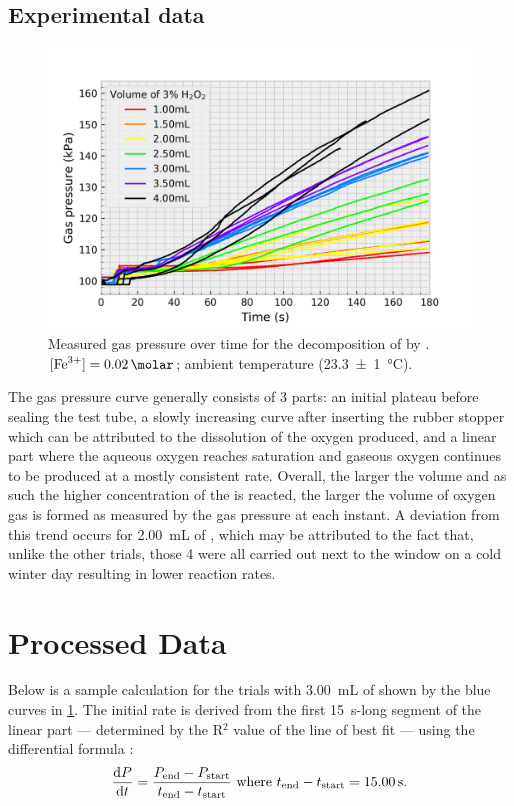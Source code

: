 \documentclass[a4paper, 12pt]{article}
\begin{document}
\subsection*{Experimental data}
\begin{figure}[H]
    \centering
    \includegraphics[width=\textwidth]{data/raw_data}
    \caption{Measured gas pressure over time for the decomposition of  by . $[\ce{Fe^{3+}}] = \SI{0.02}{\molar}$; ambient temperature (\SI{23.3(10)}{\celsius}). }
    \label{fig:raw-data}
\end{figure}

The gas pressure curve generally consists of 3 parts: an initial plateau before sealing the test tube, a slowly increasing curve after inserting the rubber stopper which can be attributed to the dissolution of the oxygen produced, and a linear part where the aqueous oxygen reaches saturation and gaseous oxygen continues to be produced at a mostly consistent rate. Overall, the larger the volume and as such the higher concentration of the  is reacted, the larger the volume of oxygen gas is formed as measured by the gas pressure at each instant. A deviation from this trend occurs for \SI{2.00}{\mL} of , which may be attributed to the fact that, unlike the other trials, those 4 were all carried out next to the window on a cold winter day resulting in lower reaction rates.

\section*{Processed Data}
Below is a sample calculation for the trials with \SI{3.00}{\mL} of  shown by the blue curves in \cref{fig:raw-data}. The initial rate is derived from the first \SI{15}{\s}-long segment of the linear part --- determined by the R$^2$ value of the line of best fit --- using the differential formula \autocite{numerical_method}:
\[ 
    \dv{P}{t} 
    = \dfrac{ P_{ \text{end} } - P_{ \text{start} } }{ t_{ \text{end} } - t_{ \text{start} } }
    \text{ where } t_{ \text{end} } - t_{ \text{start} } = \SI{15.00}{\s}. 
\]
\end{document}
